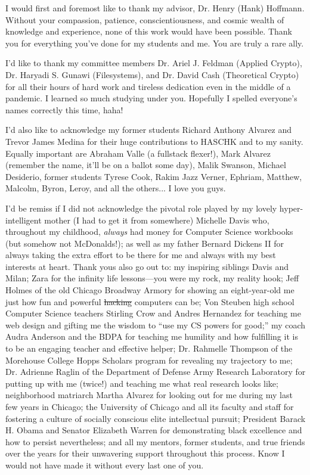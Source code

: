 \acknowledgments
I would first and foremost like to thank my advisor, Dr. Henry (Hank) Hoffmann.
Without your compassion, patience, conscientiousness, and cosmic wealth of
knowledge and experience, none of this work would have been possible. Thank you
for everything you've done for my students and me. You are truly a rare ally.

I'd like to thank my committee members Dr. Ariel J. Feldman (Applied Crypto),
Dr. Haryadi S. Gunawi (Filesystems), and Dr. David Cash (Theoretical Crypto) for
all their hours of hard work and tireless dedication even in the middle of a
pandemic. I learned so much studying under you. Hopefully I spelled everyone's
names correctly this time, haha!

I'd also like to acknowledge my former students Richard Anthony Alvarez and
Trevor James Medina for their huge contributions to HASCHK and to my sanity.
Equally important are Abraham Valle (a fullstack flexer!), Mark Alvarez
(remember the name, it'll be on a ballot some day), Malik Swanson, Michael
Desiderio, former students Tyrese Cook, Rakim Jazz Verner, Ephriam, Matthew,
Malcolm, Byron, Leroy, and all the others... I love you guys.

I'd be remiss if I did not acknowledge the pivotal role played by my lovely
hyper-intelligent mother (I had to get it from somewhere) Michelle Davis who,
throughout my childhood, \emph{always} had money for Computer Science workbooks
(but somehow not McDonalds!); as well as my father Bernard Dickens II for always
taking the extra effort to be there for me and always with my best interests at
heart. Thank yous also go out to: my inspiring siblings Davis and Milan; Zara
for the infinity life lessons---you were my rock, my reality hook; Jeff Holmes
of the old Chicago Broadway Armory for showing an eight-year-old me just how fun
and powerful \sout{hacking} computers can be; Von Steuben high school Computer
Science teachers Stirling Crow and Andres Hernandez for teaching me web design
and gifting me the wisdom to ``use my CS powers for good;'' my coach Audra
Anderson and the BDPA for teaching me humility and how fulfilling it is to be an
engaging teacher and effective helper; Dr. Rahmelle Thompson of the Morehouse
College Hopps Scholars program for revealing my trajectory to me; Dr. Adrienne
Raglin of the Department of Defense Army Research Laboratory for putting up with
me (twice!) and teaching me what real research looks like; neighborhood
matriarch Martha Alvarez for looking out for me during my last few years in
Chicago; the University of Chicago and all its faculty and staff for fostering a
culture of socially conscious elite intellectual pursuit; President Barack H.
Obama and Senator Elizabeth Warren for demonstrating black excellence and how to
persist nevertheless; and all my mentors, former students, and true friends over
the years for their unwavering support throughout this process. Know I would not
have made it without every last one of you.

